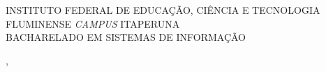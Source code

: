   \begin{capa}%
    \center
	\ABNTEXchapterfont\large{INSTITUTO FEDERAL DE EDUCAÇÃO, CIÊNCIA E TECNOLOGIA
FLUMINENSE \textit{CAMPUS} ITAPERUNA\\BACHARELADO EM SISTEMAS DE INFORMAÇÃO}

    \vfill
    \ABNTEXchapterfont\bfseries\LARGE\imprimirautor
    \vfill

	\ABNTEXchapterfont\LARGE\imprimirtitulo
	\vfill
%
    \large\imprimirlocal, \large\imprimirdata

    \vspace*{1cm}
  \end{capa}
